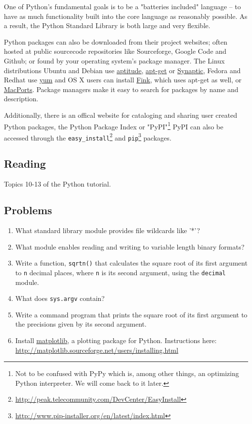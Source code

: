 One of Python's fundamental goals is to be a "batteries included" language -- to have as much functionality built into the core language as reasonably possible. As a result, the Python Standard Library is both large and very flexible. 

Python packages can also be downloaded from their project websites; often hosted at public sourcecode repositories like Sourceforge, Google Code and Github; or found by your operating system's \gls{package manager}. The Linux distributions Ubuntu and Debian use \href{http://wiki.debian.org/Aptitude?action=show&redirect=aptitude}{aptitude}, \href{http://wiki.debian.org/Apt}{apt-get} or \href{https://help.ubuntu.com/community/SynapticHowto}{Synaptic}, Fedora and Redhat use \href{http://yum.baseurl.org/}{yum} and OS X users can install \href{http://www.finkproject.org/}{Fink}, which uses apt-get as well, or \href{http://www.macports.org/index.php}{MacPorts}. Package managers make it easy to search for packages by name and description.

Additionally, there is an offical website for cataloging and sharing user created Python packages, the Python Package Index or "PyPI"\footnote{Not to be confused with PyPy which is, among other things, an optimizing Python interpreter. We will come back to it later.} PyPI can also be accessed through the \verb|easy_install|\footnote{\url{http://peak.telecommunity.com/DevCenter/EasyInstall}} and \verb|pip|\footnote{\url{http://www.pip-installer.org/en/latest/index.html}} packages.

\subsection{Reading}
Topics 10-13 of the Python tutorial.  

\subsection{Problems}

\begin{enumerate}
	\item What standard library module provides file wildcards like '*'?
	\item What module enables reading and writing to variable length binary formats?
	\item Write a function, \verb|sqrtn()| that calculates the square root of its first argument to \verb|n| decimal places, where \verb|n| is its second argument, using the \verb|decimal| module.
	\item What does \verb|sys.argv| contain?
	\item Write a command program that prints the square root of its first argument to the precisions given by its second argument.
	\item Install \href{http://matplotlib.sourceforge.net/}{matplotlib}, a plotting package for Python. Instructions here: \url{http://matplotlib.sourceforge.net/users/installing.html}

\end{enumerate}